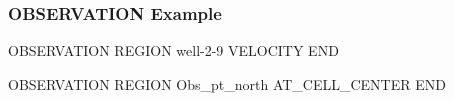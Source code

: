 \begin{frame}[fragile]\frametitle{OBSERVATION Example}

\begin{semiverbatim}
OBSERVATION
  REGION well-2-9
  VELOCITY
END

OBSERVATION
  REGION Obs_pt_north
  AT_CELL_CENTER
END
\end{semiverbatim}

\end{frame}

